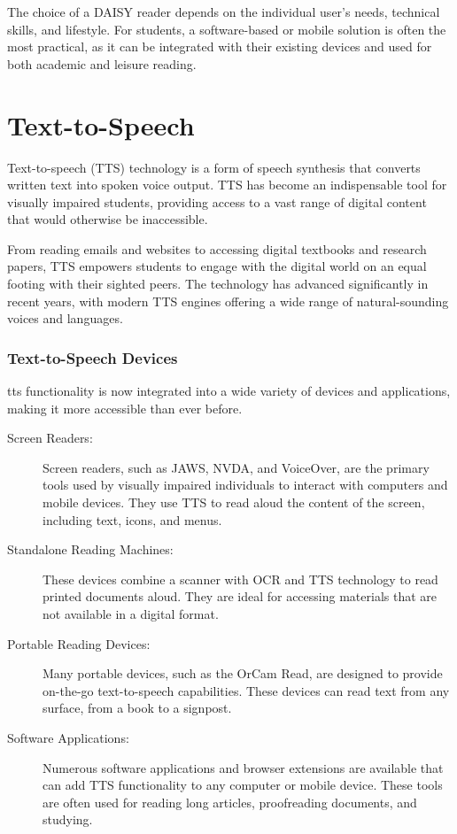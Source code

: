 The choice of a DAISY reader depends on the individual user's needs, technical skills, and lifestyle. For students, a software-based or mobile solution is often the most practical, as it can be integrated with their existing devices and used for both academic and leisure reading.

\section{Text-to-Speech}

Text-to-speech (TTS) technology is a form of speech synthesis that converts written text into spoken voice output. TTS has become an indispensable tool for visually impaired students, providing access to a vast range of digital content that would otherwise be inaccessible.

From reading emails and websites to accessing digital textbooks and research papers, TTS empowers students to engage with the digital world on an equal footing with their sighted peers. The technology has advanced significantly in recent years, with modern TTS engines offering a wide range of natural-sounding voices and languages.

\subsubsection{Text-to-Speech Devices}

\gls{tts} functionality is now integrated into a wide variety of devices and applications, making it more accessible than ever before.

\begin{description}
	\item[Screen Readers:] Screen readers, such as JAWS, NVDA, and VoiceOver, are the primary tools used by visually impaired individuals to interact with computers and mobile devices. They use TTS to read aloud the content of the screen, including text, icons, and menus.
	\item[Standalone Reading Machines:] These devices combine a scanner with OCR and TTS technology to read printed documents aloud. They are ideal for accessing materials that are not available in a digital format.
	\item[Portable Reading Devices:] Many portable devices, such as the OrCam Read, are designed to provide on-the-go text-to-speech capabilities. These devices can read text from any surface, from a book to a signpost.
	\item[Software Applications:] Numerous software applications and browser extensions are available that can add TTS functionality to any computer or mobile device. These tools are often used for reading long articles, proofreading documents, and studying.
\end{description}

